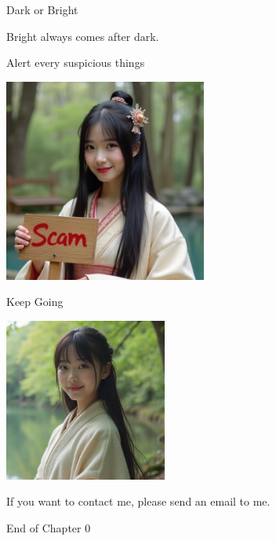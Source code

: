 \documentclass{beamer}
\begin{document}
\begin{frame}{Dark or Bright}
\begin{minipage}{0.45\textwidth}
\begin{center}
\end{center}
\begin{center}
Bright always comes after dark.
\end{center}
\end{minipage}
\end{frame}
\begin{frame}{Alert every suspicious things}
\begin{center}
\includegraphics[width=0.5\textwidth]{scam_you.png}
\end{center}
\end{frame}
\begin{frame}{Keep Going}
\begin{center}
\includegraphics[width=0.4\textwidth]{kg.png}
\end{center}
\begin{center}
If you want to contact me, please send an email to me.
\end{center}
\end{frame}
\begin{frame}{}
\begin{center}
\Large{End of Chapter 0}
\end{center}
\end{frame}
\end{document}
